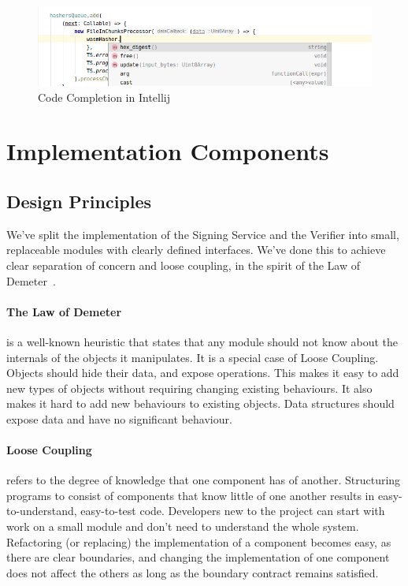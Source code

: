 \begin{figure}
    \begin{center}
        \includegraphics[width=0.7\linewidth]{images/dtside.png}
        \caption{Code Completion in Intellij}
        \label{fig:dtside}
    \end{center}
\end{figure}


\section{Implementation Components}\label{sec:implementation-components}
\subsection{Design Principles}\label{subsec:design-principles}
We've split the implementation of the Signing Service and the Verifier into small,
replaceable modules with clearly defined interfaces.
We've done this to achieve clear separation of concern and loose coupling,
in the spirit of the Law of Demeter~\cite{demeter}.

\paragraph{The Law of Demeter} is a well-known heuristic that states that any module should not know about the
internals of the objects it manipulates.
It is a special case of Loose Coupling.
Objects should hide their data, and expose operations.
This makes it easy to add new types of objects without requiring changing existing behaviours.
It also makes it hard to add new behaviours to existing objects.
Data structures should expose data and have no significant behaviour.

\paragraph{Loose Coupling} refers to the degree of knowledge that one component has of another.
Structuring programs to consist of components that know little of one another
results in easy-to-understand, easy-to-test code.
Developers new to the project can start with work on a small module and don't need to understand the whole system.
Refactoring (or replacing) the implementation of a component becomes easy,
as there are clear boundaries,
and changing the implementation of one component does not affect the others as long as
the boundary contract remains satisfied.


